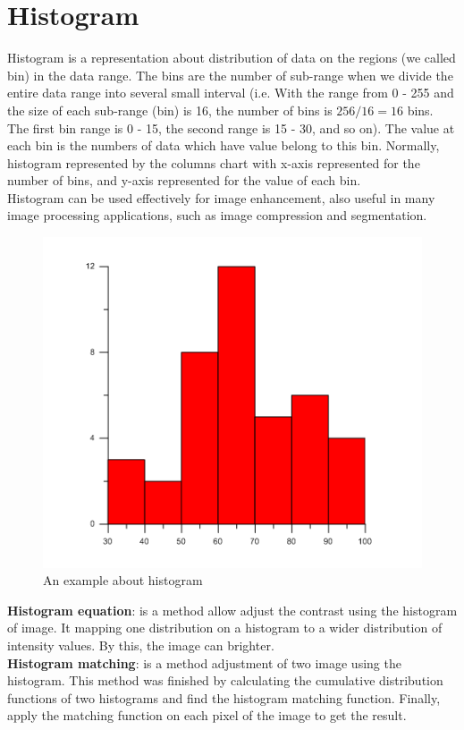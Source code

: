 \section{Histogram}
Histogram is a representation about distribution of data on the regions (we called bin) in the data range. The bins are the number of sub-range when we divide the entire data range into several small interval (i.e. With the range from 0 - 255 and the size of each sub-range (bin) is 16, the number of bins is $256/16 = 16$ bins. The first bin range is 0 - 15, the second range is 15 - 30, and so on). The value at each bin is the numbers of data which have value belong to this bin. Normally, histogram represented by the columns chart with x-axis represented for the number of bins, and y-axis represented for the value of each bin.\\
Histogram can be used effectively for image enhancement, also useful in many image processing applications, such as image compression and segmentation.\\[0.3cm]
\begin{figure}[h!]
\centering
\includegraphics[scale=2]{images/histogram}
\caption{An example about histogram}
\label{fig:figure_31}
\end{figure}
\textbf{Histogram equation}: is a method allow adjust the contrast using the histogram of image. It mapping one distribution on a histogram to a wider distribution of intensity values. By this, the image can brighter.\\[0.2cm]
\textbf{Histogram matching}: is a method adjustment of two image using the histogram. This method was finished by calculating the cumulative distribution functions of two histograms and find the histogram matching function. Finally, apply the matching function on each pixel of the image to get the result.
